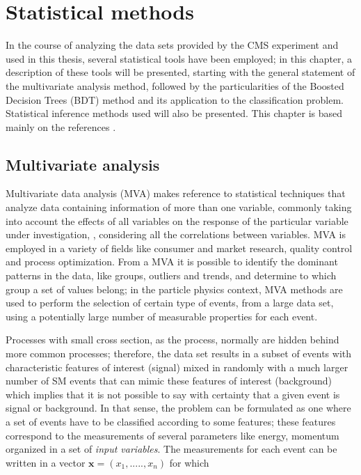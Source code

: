 \chapter{Statistical methods}\label{ch:stat}

In the course of analyzing the data sets provided by the CMS experiment and used in this thesis, several statistical tools have been employed; in this chapter, a description of these tools will be presented, starting with the general statement of the multivariate analysis method, followed by the particularities of the Boosted Decision Trees (BDT) method and its application to the classification problem. Statistical inference methods used will also be presented. This chapter is based mainly on the references \cite{mva, tmva}.      

\section{Multivariate analysis}

Multivariate data analysis (MVA) makes reference to statistical techniques that analyze data containing information of more than one variable, commonly taking into account the effects of all variables on the response of the particular variable under investigation, \ie, considering all the correlations between variables. MVA is employed in a variety of fields like consumer and market research, quality control and process optimization. From a MVA it is possible to identify the dominant patterns in the data, like groups, outliers and trends, and determine to which group a set of values belong; in the particle physics context, MVA methods are used to perform the selection of certain type of events, from a large data set, using a potentially large number of measurable properties for each event.

Processes with small cross section, as the \tHq process, normally are hidden behind more common processes; therefore, the data set results in a subset of events with characteristic features of interest (signal) mixed in randomly with a much larger number of SM events that can mimic these features of interest (background) which implies that it is not possible to say with certainty that a given event is signal or background. In that sense, the problem can be formulated as one where a set of events have to be classified according to some features; these features correspond to the measurements of several parameters like energy, momentum organized in a set of \textit{input variables}. The measurements for each event can be written in a vector $\textbf{x}=(x_1,.....,x_n)$ for which

